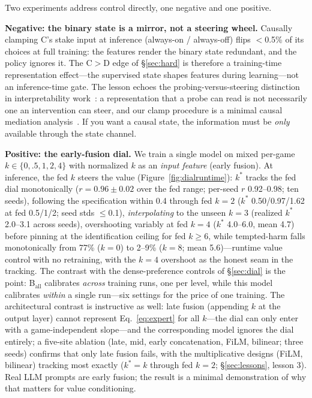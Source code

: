 \documentclass[manuscript, screen, review]{jair}
\begin{document}
Two experiments address control directly, one negative and one positive.

\textbf{Negative: the binary state is a mirror, not a steering wheel.} Causally clamping C's stake input at inference (always-on / always-off) flips $<$0.5\% of its choices at full training: the features render the binary state redundant, and the policy ignores it. The C$>$D edge of \S\ref{sec:hard} is therefore a training-time representation effect---the supervised state shapes features during learning---not an inference-time gate. The lesson echoes the probing-versus-steering distinction in interpretability work~\citep{belinkov2022probing,vig2019investigating}: a representation that a probe can read is not necessarily one an intervention can steer, and our clamp procedure is a minimal causal mediation analysis~\citep{geiger2021causal}. If you want a causal state, the information must be \emph{only} available through the state channel.

\textbf{Positive: the early-fusion dial.} We train a single model on mixed per-game $k \in \{0, .5, 1, 2, 4\}$ with normalized $k$ as an \emph{input feature} (early fusion). At inference, the fed $k$ steers the value (Figure~\ref{fig:dialruntime}): $k^*$ tracks the fed dial monotonically ($r{=}0.96\pm0.02$ over the fed range; per-seed $r$ 0.92--0.98; ten seeds), following the specification within 0.4 through fed $k{=}2$ ($k^*$ 0.50/0.97/1.62 at fed 0.5/1/2; seed stds $\leq$0.1), \emph{interpolating} to the unseen $k{=}3$ (realized $k^*$ 2.0--3.1 across seeds), overshooting variably at fed $k{=}4$ ($k^*$ 4.0--6.0, mean 4.7) before pinning at the identification ceiling for fed $k\geq6$, while tempted-harm falls monotonically from 77\% ($k{=}0$) to 2--9\% ($k{=}8$; mean 5.6)---runtime value control with no retraining, with the $k{=}4$ overshoot as the honest seam in the tracking. The contrast with the dense-preference controls of \S\ref{sec:dial} is the point: B$_{\mathrm{all}}$ calibrates \emph{across} training runs, one per level, while this model calibrates \emph{within} a single run---six settings for the price of one training. The architectural contrast is instructive as well: late fusion (appending $k$ at the output layer) cannot represent Eq.~\eqref{eq:expert} for all $k$---the dial can only enter with a game-independent slope---and the corresponding model ignores the dial entirely; a five-site ablation (late, mid, early concatenation, FiLM, bilinear; three seeds) confirms that only late fusion fails, with the multiplicative designs (FiLM, bilinear) tracking most exactly ($k^*{=}k$ through fed $k{=}2$; \S\ref{sec:lessons}, lesson 3). Real LLM prompts are early fusion; the result is a minimal demonstration of why that matters for value conditioning.
\end{document}
